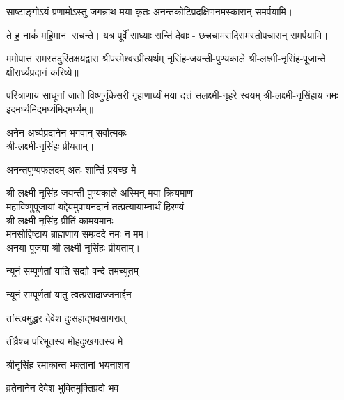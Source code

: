 \begin{center}
{साष्टाङ्गोऽयं प्रणामोऽस्तु जगन्नाथ मया कृतः}
अनन्तकोटिप्रदक्षिणनमस्कारान् समर्पयामि।\medskip

{ते ह॒ नाकं॑ महि॒मान॑ सचन्ते। यत्र॒ पूर्वे॑ सा॒ध्याः सन्ति॑ दे॒वाः}
- छत्त्रचामरादिसमस्तोपचारान् समर्पयामि।\medskip

ममोपात्त समस्तदुरितक्षयद्वारा श्रीपरमेश्वरप्रीत्यर्थम्  नृसिंह-जयन्ती-पुण्यकाले  श्री-लक्ष्मी-नृसिंह-पूजान्ते क्षीरार्घ्यप्रदानं करिष्ये॥
\medskip

{परित्राणाय   साधूनां   जातो   विष्णुर्नृकेसरी}
{गृहाणार्घ्यं   मया   दत्तं   सलक्ष्मी-नृहरे   स्वयम्}
	श्री-लक्ष्मी-नृसिंहाय नमः इदमर्घ्यमिदमर्घ्यमिदमर्घ्यम्॥\medskip

अनेन अर्घ्यप्रदानेन भगवान् सर्वात्मकः\\ श्री-लक्ष्मी-नृसिंहः प्रीयताम्।\medskip

{अनन्तपुण्यफलदम् अतः शान्तिं प्रयच्छ मे}

श्री-लक्ष्मी-नृसिंह-जयन्ती-पुण्यकाले अस्मिन् मया क्रियमाण\\
महाविष्णुपूजायां यद्देयमुपायनदानं तत्प्रत्यायाम्नार्थं हिरण्यं\\
श्री-लक्ष्मी-नृसिंह-प्रीतिं कामयमानः\\
मनसोद्दिष्टाय ब्राह्मणाय सम्प्रददे नमः न मम।\\ 
अनया पूजया श्री-लक्ष्मी-नृसिंहः प्रीयताम्। 
 

{न्यूनं सम्पूर्णतां याति सद्यो वन्दे तमच्युतम्}

{न्यूनं सम्पूर्णतां यातु त्वत्प्रसादाज्जनार्द्दन}

{तांस्त्वमुद्धर   देवेश   दुःसहाद्भवसागरात्}

{तीव्रैश्च  परिभूतस्य   मोहदुःखगतस्य   मे}

{श्रीनृसिंह   रमाकान्त   भक्तानां   भयनाशन}

{व्रतेनानेन   देवेश   भुक्तिमुक्तिप्रदो   भव}


\end{center}
